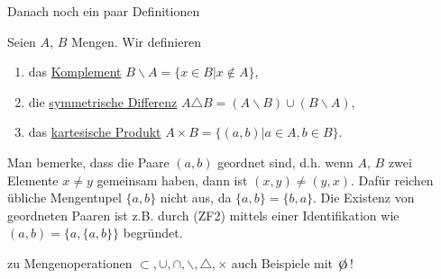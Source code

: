 Danach noch ein paar Definitionen

\begin{definition}
    Seien $A$, $B$ Mengen. Wir definieren
    \begin{enumerate}
        \item das \underline{Komplement} $B \backslash A = \{x \in B | x \notin A\}$,
        \item die \underline{symmetrische Differenz} $A \triangle B = (A \backslash B) \cup (B \backslash A)$,
        \item das \underline{kartesische Produkt} $A \times B = \{ (a, b) | a \in A, b \in B\}$.
    \end{enumerate}
\end{definition}

Man bemerke, dass die Paare $(a, b)$ geordnet sind, d.h. wenn $A$, $B$ zwei Elemente $x \neq y$ gemeinsam haben, dann ist $(x, y) \neq (y, x)$. Dafür reichen übliche Mengentupel $\{a, b\}$ nicht aus, da $\{a, b\} = \{b, a\}$. Die Existenz von geordneten Paaren ist z.B. durch (ZF2) mittels einer Identifikation wie $(a, b) = \{a, \{a, b\}\}$ begründet.

\begin{example}
    zu Mengenoperationen $\subset, \cup, \cap, \backslash, \triangle, \times$ auch Beispiele mit $\e$!
\end{example}

